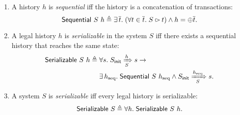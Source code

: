 \begin{definition}
  \label{def-seq-sz}\mbox{}\vspace{-8pt}\\
  \begin{enumerate}[leftmargin=*]
  \item A history $h$ is \emph{sequential} iff the history is a concatenation of transactions:
    \begin{displaymath}
      \mathsf{Sequential}\ S\ h \triangleq \exists\, \overline{t}.\; (\forall t \in \overline{t}.\; S \rightslice t) \wedge h = \oplus \overline{t}.
    \end{displaymath}
  \item A legal history $h$ is \emph{serializable} in the system $S$ iff there exists a sequential history that reaches the same state:
    \begin{align*}
      \mathsf{Serializable}\ S\ h \triangleq\; & \forall s.\; S_{\textsf{init}} \xRightarrow[S]{h} s \to\\
      & \exists\, h_{\textrm{seq}}.\; \mathsf{Sequential}\ S\ h_{\textrm{seq}} \wedge S_{\textsf{init}} \xRightarrow[S]{h_{\textrm{seq}}} s.
    \end{align*}
  \item A system $S$ is \emph{serializable} iff every legal history is serializable:
    \begin{displaymath}
      \mathsf{Serializable}\ S \triangleq \forall h.\; \mathsf{Serializable}\ S\ h.
    \end{displaymath}
  \end{enumerate}
  \label{def-sz}
\end{definition}

